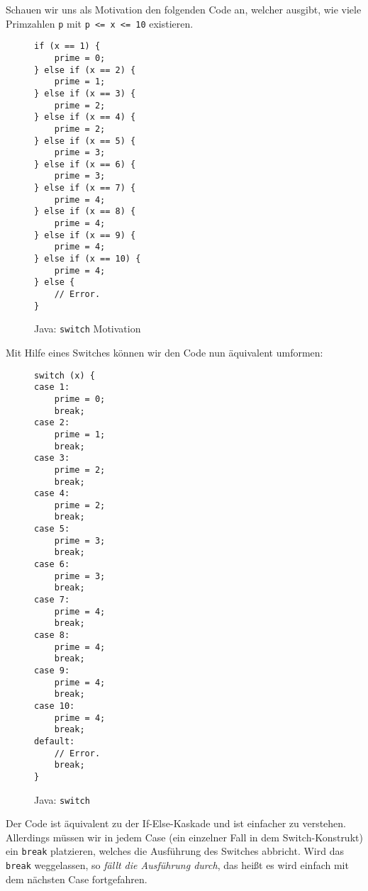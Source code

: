 		Schauen wir uns als Motivation den folgenden Code an, welcher ausgibt, wie viele Primzahlen \texttt{p} mit \texttt{p <= x <= 10} existieren.
		\begin{figure}[H]
			\centering
			\begin{lstlisting}
if (x == 1) {
	prime = 0;
} else if (x == 2) {
	prime = 1;
} else if (x == 3) {
	prime = 2;
} else if (x == 4) {
	prime = 2;
} else if (x == 5) {
	prime = 3;
} else if (x == 6) {
	prime = 3;
} else if (x == 7) {
	prime = 4;
} else if (x == 8) {
	prime = 4;
} else if (x == 9) {
	prime = 4;
} else if (x == 10) {
	prime = 4;
} else {
	// Error.
}
			\end{lstlisting}
			\caption{Java: \texttt{switch} Motivation}
		\end{figure}
		
		Mit Hilfe eines Switches können wir den Code nun äquivalent umformen:
		\begin{figure}[H]
			\centering
			\begin{lstlisting}
switch (x) {
case 1:
	prime = 0;
	break;
case 2:
	prime = 1;
	break;
case 3:
	prime = 2;
	break;
case 4:
	prime = 2;
	break;
case 5:
	prime = 3;
	break;
case 6:
	prime = 3;
	break;
case 7:
	prime = 4;
	break;
case 8:
	prime = 4;
	break;
case 9:
	prime = 4;
	break;
case 10:
	prime = 4;
	break;
default:
	// Error.
	break;
}
			\end{lstlisting}
			\caption{Java: \texttt{switch}}
		\end{figure}
		
		Der Code ist äquivalent zu der If-Else-Kaskade und ist einfacher zu verstehen. Allerdings müssen wir in jedem Case (ein einzelner Fall in dem Switch-Konstrukt) ein \texttt{break} platzieren, welches die Ausführung des Switches abbricht. Wird das \texttt{break} weggelassen, so \textit{fällt die Ausführung durch}, das heißt es wird einfach mit dem nächsten Case fortgefahren.
		

